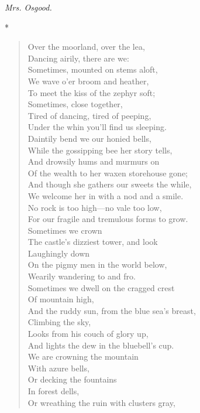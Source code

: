\documentclass[11pt,twoside]{article}
\newcommand\stars{\begin{center}*\quad*\quad*\end{center}}
\newcommand\by[1]{\par\hfill\textit{#1}\par}
\begin{document}
\by{Mrs. Osgood.}

\stars

\begin{verse}
Over the moorland, over the lea,\\
Dancing airily, there are we:\\
Sometimes, mounted on stems aloft,\\
\quad We wave o’er broom and heather,\\
To meet the kiss of the zephyr soft;\\
\quad Sometimes, close together,\\
Tired of dancing, tired of peeping,\\
Under the whin you’ll find us sleeping.\\
Daintily bend we our honied bells,\\
While the gossipping bee her story tells,\\
And drowsily hums and murmurs on\\
Of the wealth to her waxen storehouse gone;\\
And though she gathers our sweets the while,\\
We welcome her in with a nod and a smile.\\
No rock is too high---no vale too low,\\
For our fragile and tremulous forms to grow.\\
\quad Sometimes we crown\\
The castle’s dizziest tower, and look\\
\quad Laughingly down\\
On the pigmy men in the world below,\\
\quad Wearily wandering to and fro.\\
Sometimes we dwell on the cragged crest\\
\quad Of mountain high,\\
And the ruddy sun, from the blue sea’s breast,\\
\quad Climbing the sky,\\
Looks from his couch of glory up,\\
And lights the dew in the bluebell’s cup.\\
We are crowning the mountain\\
\quad With azure bells,\\
\quad Or decking the fountains\\
\quad In forest dells,\\
Or wreathing the ruin with clusters gray,\\

\end{verse}
\end{document}
